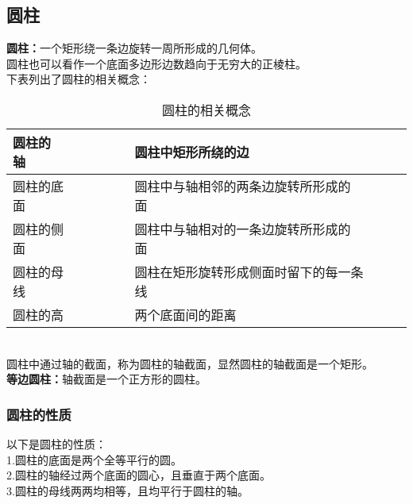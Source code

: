 \documentclass[UTF8]{ctexart}
\begin{document}
\subsection{圆柱}
    \textbf{圆柱：}一个矩形绕一条边旋转一周所形成的几何体。\\[3mm]
    圆柱也可以看作一个底面多边形边数趋向于无穷大的正棱柱。\\[3mm]
    下表列出了圆柱的相关概念：\vspace{5pt}
    \begin{table}[h]
        \begin{center}
            \begin{tabular}{l|l}
                \hline
                圆柱的轴~~~~~~~~&圆柱中矩形所绕的边~~~~~~~~\\ \hline
                圆柱的底面~~~~~~~~&圆柱中与轴相邻的两条边旋转所形成的面~~~~~~~~\\ \hline
                圆柱的侧面~~~~~~~~&圆柱中与轴相对的一条边旋转所形成的面~~~~~~~~\\ \hline
                圆柱的母线~~~~~~~~&圆柱在矩形旋转形成侧面时留下的每一条线~~~~~~~~\\ \hline
                圆柱的高~~~~~~~~&两个底面间的距离~~~~~~~~\\ \hline
            \end{tabular}
            \caption{圆柱的相关概念}
        \end{center}
    \end{table}\\
    圆柱中通过轴的截面，称为圆柱的轴截面，显然圆柱的轴截面是一个矩形。\\[3mm]
    \textbf{等边圆柱：}轴截面是一个正方形的圆柱。\\

\subsubsection{圆柱的性质}
    以下是圆柱的性质：\\[3mm]
    1.圆柱的底面是两个全等平行的圆。\\[3mm]
    2.圆柱的轴经过两个底面的圆心，且垂直于两个底面。\\[3mm]
    3.圆柱的母线两两均相等，且均平行于圆柱的轴。

\newpage
\end{document}
